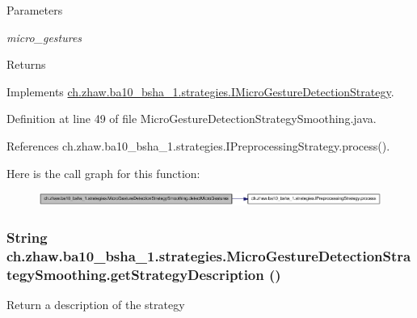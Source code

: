 \begin{DoxyParams}{Parameters}
\item[{\em micro\_\-gestures}]\end{DoxyParams}
\begin{DoxyReturn}{Returns}

\end{DoxyReturn}


Implements \hyperlink{interfacech_1_1zhaw_1_1ba10__bsha__1_1_1strategies_1_1IMicroGestureDetectionStrategy_a8593331fb67e5d4dc890d3db9f2d1b58}{ch.zhaw.ba10\_\-bsha\_\-1.strategies.IMicroGestureDetectionStrategy}.

Definition at line 49 of file MicroGestureDetectionStrategySmoothing.java.

References ch.zhaw.ba10\_\-bsha\_\-1.strategies.IPreprocessingStrategy.process().

Here is the call graph for this function:\nopagebreak
\begin{figure}[H]
\begin{center}
\leavevmode
\includegraphics[width=410pt]{classch_1_1zhaw_1_1ba10__bsha__1_1_1strategies_1_1MicroGestureDetectionStrategySmoothing_acdb5b6b2bb7ad9f48c79b88770113f45_cgraph}
\end{center}
\end{figure}
\hypertarget{classch_1_1zhaw_1_1ba10__bsha__1_1_1strategies_1_1MicroGestureDetectionStrategySmoothing_a5189e1b6d591f58bbe190f59cd6ad18f}{
\subsubsection[{getStrategyDescription}]{\setlength{\rightskip}{0pt plus 5cm}String ch.zhaw.ba10\_\-bsha\_\-1.strategies.MicroGestureDetectionStrategySmoothing.getStrategyDescription ()}}
\label{classch_1_1zhaw_1_1ba10__bsha__1_1_1strategies_1_1MicroGestureDetectionStrategySmoothing_a5189e1b6d591f58bbe190f59cd6ad18f}
Return a description of the strategy

